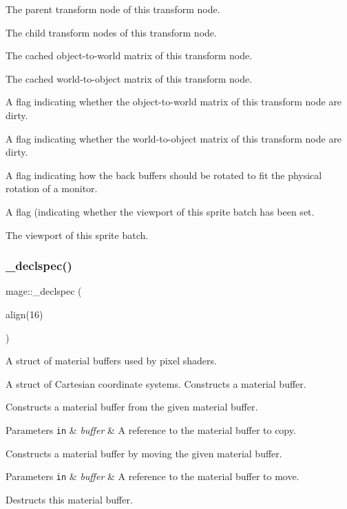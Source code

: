 The parent transform node of this transform node.

The child transform nodes of this transform node.

The cached object-\/to-\/world matrix of this transform node.

The cached world-\/to-\/object matrix of this transform node.

A flag indicating whether the object-\/to-\/world matrix of this transform node are dirty.

A flag indicating whether the world-\/to-\/object matrix of this transform node are dirty.

A flag indicating how the back buffers should be rotated to fit the physical rotation of a monitor.

A flag (indicating whether the viewport of this sprite batch has been set.

The viewport of this sprite batch.\hypertarget{namespacemage_a76dac28d69746bdef408a08c36a7c862}{}\label{namespacemage_a76dac28d69746bdef408a08c36a7c862} 
\subsubsection{\texorpdfstring{\+\_\+declspec()}{\_declspec()}}
{\footnotesize\ttfamily mage\+::\+\_\+declspec (\begin{DoxyParamCaption}\item[{align(16)}]{ }\end{DoxyParamCaption})\hspace{0.3cm}{\ttfamily [final]}}

A struct of material buffers used by pixel shaders.

A struct of Cartesian coordinate systems. Constructs a material buffer.

Constructs a material buffer from the given material buffer.


\begin{DoxyParams}[1]{Parameters}
\mbox{\tt in}  & {\em buffer} & A reference to the material buffer to copy.\\
\hline
\end{DoxyParams}
Constructs a material buffer by moving the given material buffer.


\begin{DoxyParams}[1]{Parameters}
\mbox{\tt in}  & {\em buffer} & A reference to the material buffer to move.\\
\hline
\end{DoxyParams}
Destructs this material buffer.

